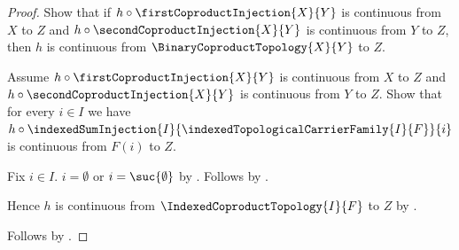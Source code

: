\begin{proof}
    Show that if
        $h\circ\firstCoproductInjection{X}{Y}$ is continuous from
            $X$ to $Z$ and
        $h\circ\secondCoproductInjection{X}{Y}$ is continuous from
            $Y$ to $Z$, then
        $h$ is continuous from $\BinaryCoproductTopology{X}{Y}$ to $Z$.
    \begin{subproof}
        Assume $h\circ\firstCoproductInjection{X}{Y}$ is continuous from
            $X$ to $Z$ and
            $h\circ\secondCoproductInjection{X}{Y}$ is continuous from
            $Y$ to $Z$.
        Show that for every $i\in I$ we have
            $h\circ\indexedSumInjection{I}{
                \indexedTopologicalCarrierFamily{I}{F}}{i}$
            is continuous from $F(i)$ to $Z$.
        \begin{subproof}
            Fix $i\in I$.
            $i=\emptyset$ or $i=\suc{\emptyset}$ by
                .
            Follows by
                .
        \end{subproof}
        Hence $h$ is continuous from $\IndexedCoproductTopology{I}{F}$
            to $Z$ by
            .
    \end{subproof}
    Follows by \auto.
\end{proof}
